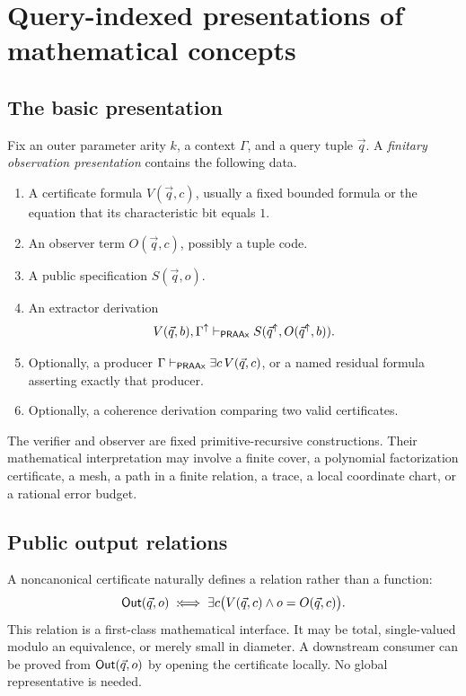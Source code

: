 \section{Query-indexed presentations of mathematical concepts}
\label{sec:presentations}

\subsection{The basic presentation}

Fix an outer parameter arity \(k\), a context \(\Gamma\), and a query tuple
\(\vec q\).  A \emph{finitary observation presentation} contains the following
data.

\begin{enumerate}[label=(P\arabic*)]
\item A certificate formula \(V(\vec q,c)\), usually a fixed bounded formula or
  the equation that its characteristic bit equals \(1\).
\item An observer term \(O(\vec q,c)\), possibly a tuple code.
\item A public specification \(S(\vec q,o)\).
\item An extractor derivation
  \[
     V(\vec q,b),\Gamma^{\mathord{\uparrow}}
       \mathrel{\vdash_{\mathsf{PRAAx}}} S(\vec q^{\mathord{\uparrow}},O(\vec q^{\mathord{\uparrow}},b)).
  \]
\item Optionally, a producer
  \(\Gamma\mathrel{\vdash_{\mathsf{PRAAx}}}\exists c\,V(\vec q,c)\), or a named residual formula
  asserting exactly that producer.
\item Optionally, a coherence derivation comparing two valid certificates.
\end{enumerate}

The verifier and observer are fixed primitive-recursive constructions.  Their
mathematical interpretation may involve a finite cover, a polynomial
factorization certificate, a mesh, a path in a finite relation, a trace, a
local coordinate chart, or a rational error budget.

\subsection{Public output relations}

A noncanonical certificate naturally defines a relation rather than a
function:
\[
  \mathsf{Out}(\vec q,o)\;:\!\Longleftrightarrow\;
  \exists c\bigl(V(\vec q,c)\wedge o=O(\vec q,c)\bigr).
\]
This relation is a first-class mathematical interface.  It may be total,
single-valued modulo an equivalence, or merely small in diameter.  A downstream
consumer can be proved from \(\mathsf{Out}(\vec q,o)\) by opening the certificate
locally.  No global representative is needed.

